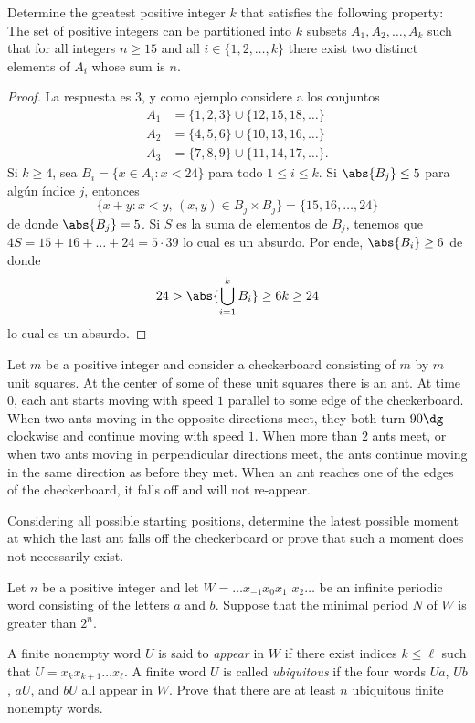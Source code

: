 \begin{probEG}[ISL 2011/C4]
	Determine the greatest positive integer $k$ that satisfies the following property: The set of positive integers can be partitioned into $k$ subsets $A_1,A_2,\dots,A_k$ such that for all integers $n\ge 15$ and all $i\in\{1,2,\dots,k\}$ there exist two distinct elements of $A_i$ whose sum is $n$.
\end{probEG}

\begin{proof}
	La respuesta es $3$, y como ejemplo considere a los conjuntos
	\begin{align*}
		A_1&=\{1,2,3\}\cup\{12,15,18,\dots\}\\
		A_2&=\{4,5,6\}\cup\{10,13,16,\dots\}\\
		A_3&=\{7,8,9\}\cup\{11,14,17,\dots\}.
	\end{align*}
	Si $k\ge 4$, sea $B_i=\{x\in A_i:x<24\}$ para todo $1\le i\le k$. Si $\abs{B_j}\le 5$ para algún índice $j$, entonces
	\[\{x+y:x<y,\,(x,y)\in B_j\times B_j\}=\{15,16,\dots,24\}\]
	de donde $\abs{B_j}=5$. Si $S$ es la suma de elementos de $B_j$, tenemos que $4S=15+16+\dots+24=5\cdot 39$ lo cual es un absurdo. Por ende, $\abs{B_i}\ge 6$ de donde
	\[24>\abs{\bigcup_{i=1}^kB_i}\ge 6k\ge 24\]
	lo cual es un absurdo.
\end{proof}

\begin{probHR}[ISL 2011/C5]
	Let $m$ be a positive integer and consider a checkerboard consisting of $m$ by $m$ unit squares. At the center of some of these unit squares there is an ant. At time $0$, each ant starts moving with speed $1$ parallel to some edge of the checkerboard. When two ants moving in the opposite directions meet, they both turn $90\dg$ clockwise and continue moving with speed $1$. When more than $2$ ants meet, or when two ants moving in perpendicular directions meet, the ants continue moving in the same direction as before they met. When an ant reaches one of the edges of the checkerboard, it falls off and will not re-appear.

	Considering all possible starting positions, determine the latest possible moment at which the last ant falls off the checkerboard or prove that such a moment does not necessarily exist.
\end{probHR}


\begin{probEG}[ISL 2011/C6]
	Let $n$ be a positive integer and let $W=\dots x_{-1}x_0x_1$ $x_2\dots$ be an infinite periodic word consisting of the letters $a$ and $b$. Suppose that the minimal period $N$ of $W$ is greater than $2^n$.

	A finite nonempty word $U$ is said to \emph{appear} in $W$ if there exist indices $k\le\ell$ such that $U=x_kx_{k+1}\dots x_\ell$. A finite word $U$ is called \emph{ubiquitous} if the four words $Ua$, $Ub$, $aU$, and $bU$ all appear in $W$. Prove that there are at least $n$ ubiquitous finite nonempty words.
\end{probEG}

